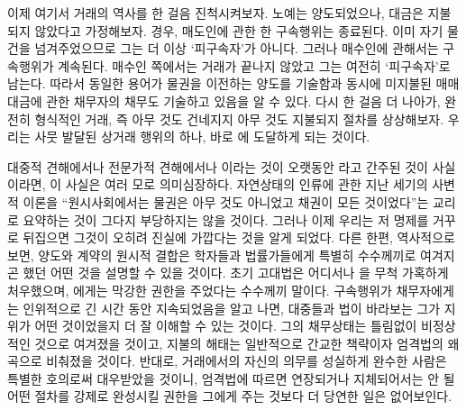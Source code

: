 이제 여기서
거래의 역사를 한 걸음 진척시켜보자.
노예는 양도되었으나,
대금은 지불되지 않았다고 가정해보자.
 경우,
매도인에 관한 한 구속행위는 종료된다.
이미 자기 물건을 넘겨주었으므로 그는 더 이상 `피구속자'가 아니다.
그러나 매수인에 관해서는 구속행위가 계속된다.
매수인 쪽에서는 거래가 끝나지 않았고 그는 여전히 `피구속자'로 남는다.
따라서 동일한 용어가 물권을 이전하는 양도를 기술함과 동시에
미지불된 매매대금에 관한 채무자의 채무도 기술하고 있음을 알 수 있다.
다시 한 걸음 더 나아가,
완전히 형식적인 거래, 즉 아무 것도 건네지지 
아무 것도 지불되지  절차를 상상해보자.
우리는 사뭇 발달된 상거래 행위의 하나, 바로
 에
도달하게 되는 것이다.

대중적 견해에서나 전문가적 견해에서나
이라는 것이
오랫동안 라고
간주된 것이 사실이라면,
이 사실은 여러 모로 의미심장하다.
자연상태의 인류에 관한 지난 세기의 사변적 이론을
``원시사회에서는 물권은 아무 것도 아니었고 채권이 모든 것이었다''는
교리로 요약하는 것이 그다지 부당하지는 않을 것이다.
그러나 이제 우리는
저 명제를 거꾸로 뒤집으면
그것이 오히려 진실에 가깝다는 것을 알게 되었다.
다른 한편,
역사적으로 보면,
양도와 계약의 원시적 결합은
학자들과 법률가들에게 특별히 수수께끼로 여겨지곤 했던 어떤 것을
설명할 수 있을 것이다.
초기 고대법은 어디서나 을 무척 가혹하게 처우했으며,
에게는 막강한 권한을 주었다는 수수께끼 말이다.
구속행위가 채무자에게는 인위적으로 긴 시간 동안 지속되었음을 알고 나면,
대중들과 법이 바라보는 그가 지위가 어떤 것이었을지
더 잘 이해할 수 있는 것이다.
그의 채무상태는 틀림없이 비정상적인 것으로 여겨졌을 것이고,
지불의 해태는 일반적으로
간교한 책략이자 엄격법의 왜곡으로 비춰졌을 것이다.
반대로,
거래에서의 자신의 의무를 성실하게 완수한 사람은
특별한 호의로써 대우받았을 것이니,
엄격법에 따르면 연장되거나 지체되어서는 안 될
어떤 절차를 강제로 완성시킬 권한을 그에게 주는 것보다
더 당연한 일은 없어보인다.

